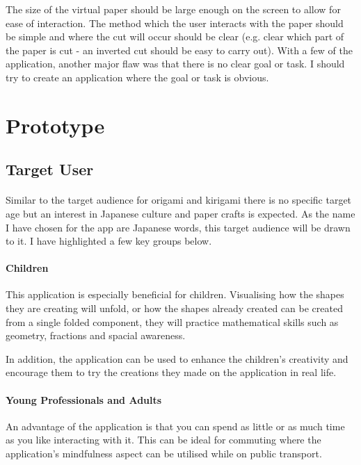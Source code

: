\documentclass[11pt]{article}
\begin{document}
            The size of the virtual paper should be large enough on the screen to allow for ease of interaction. The method which the user interacts with the paper should be simple and where the cut will occur should be clear (e.g. clear which part of the paper is cut - an inverted cut should be easy to carry out). 
            With a few of the application, another major flaw was that there is no clear goal or task. I should try to create an application where the goal or task is obvious.


\newpage
\section{Prototype}

    \subsection{Target User}
    
            \paragraph{}
            Similar to the target audience for origami and kirigami there is no specific target age but an interest in Japanese culture and paper crafts is expected. As the name I have chosen for the app are Japanese words, this target audience will be drawn to it. I have highlighted a few key groups below. 
            
            \paragraph{Children}
            This application is especially beneficial for children. Visualising how the shapes they are creating will unfold, or how the shapes already created can be created from a single folded component, they will practice mathematical skills such as geometry, fractions and spacial awareness.
            
            In addition, the application can be used to enhance the children's creativity and encourage them to try the creations they made on the application in real life. 
            
            \paragraph{Young Professionals and Adults}
            An advantage of the application is that you can spend as little or as much time as you like interacting with it. This can be ideal for commuting where the application's mindfulness aspect can be utilised while on public transport.
\end{document}
